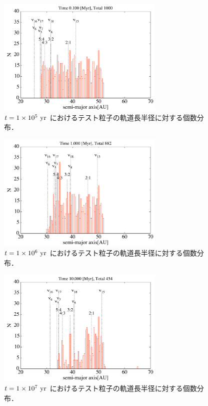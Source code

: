 \documentclass[11pt,a4paper,oneside,onecolumn]{jreport}
\begin{document}
\begin{figure}[H]
\centering
\includegraphics[width=8cm]{./image/kuiper_histogram_100kyr.pdf}
\caption{$t = 1 \times 10^5\ {\rm yr}$ におけるテスト粒子の軌道長半径に対する個数分布．\label{fig:kuiper_histogram_100kyr}}
\end{figure}

\begin{figure}[H]
\centering
\includegraphics[width=8cm]{./image/kuiper_histogram_1Myr.pdf}
\caption{$t = 1 \times 10^6\ {\rm yr}$ におけるテスト粒子の軌道長半径に対する個数分布．\label{fig:kuiper_histogram_1Myr}}
\end{figure}

\begin{figure}[H]
\centering
\includegraphics[width=8cm]{./image/kuiper_histogram_10Myr.pdf}
\caption{$t = 1 \times 10^7\ {\rm yr}$ におけるテスト粒子の軌道長半径に対する個数分布．\label{fig:kuiper_histogram_10Myr}}
\end{figure}
\end{document}
